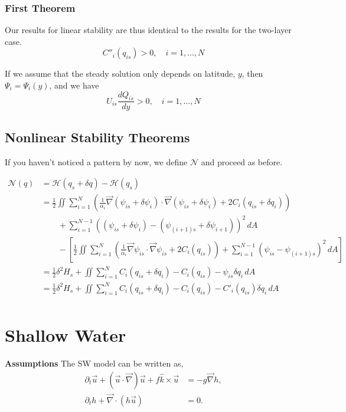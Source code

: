 \documentclass[12pt]{article}
\begin{document}
    \subsubsection{First Theorem}
    Our results for linear stability are thus identical to the results for the two-layer case.
    $$
    C''_i(q_{is}) > 0, \quad i=1,...,N
    $$

    If we assume that the steady solution only depends on latitude, $y$, then $\Psi_i = \Psi_i(y)$, and we have
    $$
    U_{is} \frac{d Q_{is}}{dy} > 0, \quad i=1,...,N
    $$

  \subsection{Nonlinear Stability Theorems}
    If you haven't noticed a pattern by now, we define $\mathcal{N}$ and proceed as before.

    \begin{align*}
      \mathcal{N}(q)
      & = \mathcal{H}(q_s + \delta q) - \mathcal{H}(q_s) \\
      &= \frac12 \iint \sum_{i=1}^N \left( \frac{1}{\alpha_i}\vec\nabla (\psi_{is} + \delta\psi_i) \cdot \vec\nabla (\psi_{is} + \delta\psi_i) + 2C_i(q_{is} + \delta q_i) \right) \\
      &\quad\quad + \sum_{i=1}^{N-1}((\psi_{is} + \delta\psi_i) - (\psi_{(i+1)s} + \delta\psi_{i+1}))^2 \, dA \\
      &\quad\quad - \left[ \frac12 \iint \sum_{i=1}^N \left( \frac{1}{\alpha_i}\vec\nabla \psi_{is} \cdot \vec\nabla \psi_{is} + 2C_i(q_{is}) \right) + \sum_{i=1}^{N-1}(\psi_{is} - \psi_{(i+1)s})^2 \, dA \right] \\
      &= \frac12 \delta^2 H_s + \iint \sum_{i=1}^N C_i(q_{is} + \delta q_i) - C_i(q_{is}) - \psi_{is}\delta q_i \, dA \\
      &= \frac12 \delta^2 H_s + \iint \sum_{i=1}^N C_i(q_{is} + \delta q_i) - C_i(q_{is}) - C'_i(q_{is})\delta q_i \, dA \\
    \end{align*}


\section{Shallow Water}

  \textbf{Assumptions}
  The SW model can be written as,
  \begin{align*}
  \partial_t \vec u + (\vec u \cdot \vec \nabla) \vec u + f \hat k \times \vec u &= - g \vec \nabla h, \\
  \partial_t h + \vec\nabla \cdot \left( h \vec u \right) & = 0.
  \end{align*}
\end{document}
